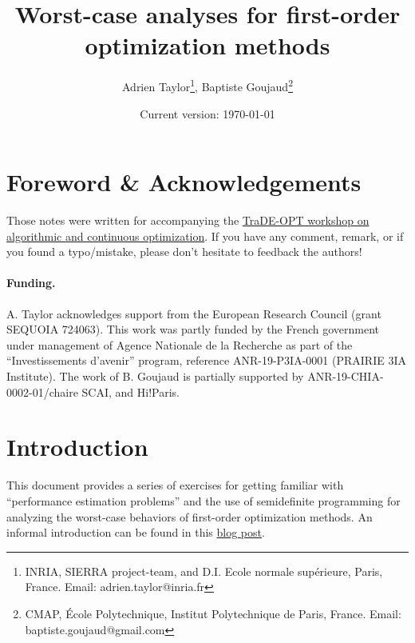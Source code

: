 \documentclass[11pt,a4paper]{article}
\begin{document}
	\author{Adrien Taylor\footnote{INRIA, SIERRA project-team, and D.I. Ecole normale sup\'erieure, Paris, France. Email: adrien.taylor@inria.fr}, Baptiste Goujaud\footnote{CMAP, École Polytechnique, Institut Polytechnique de Paris, France. Email: baptiste.goujaud@gmail.com}}
	
	\title{Worst-case analyses for first-order optimization methods}
	\date{Current version: \today}
	\maketitle
	
	\renewcommand*\contentsname{}
	\setcounter{tocdepth}{2} \tableofcontents
	


	\section*{Foreword \& Acknowledgements}
	Those notes were written for accompanying the \href{https://trade-opt-itn.eu/workshop.html}{TraDE-OPT workshop on algorithmic and continuous optimization}. If you have any comment, remark, or if you found a typo/mistake, please don't hesitate to feedback the authors!
	
	\paragraph*{Funding.} A. Taylor acknowledges support from the European Research Council (grant SEQUOIA 724063). This work was partly funded by the French government under management of Agence Nationale de la Recherche as part of the ``Investissements d’avenir'' program, reference ANR-19-P3IA-0001 (PRAIRIE 3IA Institute). The work of B. Goujaud is partially supported by ANR-19-CHIA-0002-01/chaire SCAI, and Hi!Paris. 
	
	\clearpage
	\section{Introduction}			%
	
	This document provides a series of exercises for getting familiar with ``performance estimation problems'' and the use of semidefinite programming for analyzing the worst-case behaviors of first-order optimization methods. An informal introduction can be found in this \href{https://francisbach.com/computer-aided-analyses/}{blog post}.
	
\end{document}
